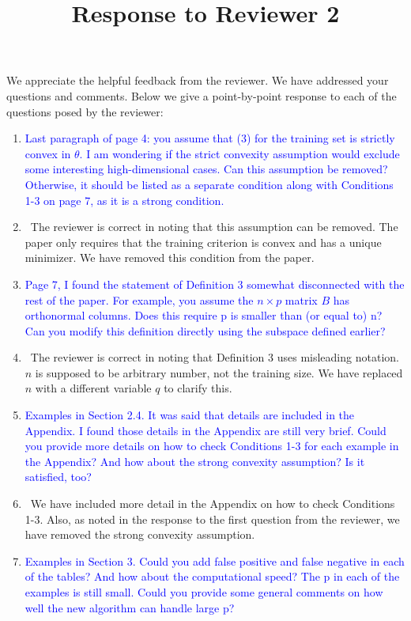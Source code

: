 \documentclass[]{article}
\title{Response to Reviewer 2}
\newcommand{\point}[1]{\item \textcolor{blue}{#1}}
\newcommand{\reply}{\item[]\ }
\begin{document}
	\maketitle
		
	We appreciate the helpful feedback from the reviewer. We have addressed your questions and comments. Below we give a point-by-point response to each of the questions posed by the reviewer:
		
	\begin{enumerate}
		\point{Last paragraph of page 4: you assume that (3) for the training set is strictly convex in $\theta$. I am wondering if the strict convexity assumption would exclude some interesting high-dimensional cases. Can this assumption be removed? Otherwise, it should be listed as a separate condition along with Conditions 1-3 on page 7, as it is a strong condition.}
		
		\reply The reviewer is correct in noting that this assumption can be removed. The paper only requires that the training criterion is convex and has a unique minimizer. We have removed this condition from the paper.
		
		\point{Page 7, I found the statement of Definition 3 somewhat disconnected with the rest of the paper. For example, you assume the $n\times p$ matrix $B$ has orthonormal columns. Does this require p is smaller than (or equal to) n? Can you modify this definition directly using the subspace defined earlier?}
		
		\reply The reviewer is correct in noting that Definition 3 uses misleading notation. $n$ is supposed to be arbitrary number, not the training size. We have replaced $n$ with a different variable $q$ to clarify this. 
		
		\point{Examples in Section 2.4. It was said that details are included in the Appendix. I found those details in the Appendix are still very brief. Could you provide more details on how to check Conditions 1-3 for each example in the Appendix? And how about the strong convexity assumption? Is it satisfied, too?}
		
		\reply We have included more detail in the Appendix on how to check Conditions 1-3. Also, as noted in the response to the first question from the reviewer, we have removed the strong convexity assumption.
		
		\point{Examples in Section 3. Could you add false positive and false negative in each of the tables? And how about the computational speed? The p in each of the examples is still small. Could you provide some general comments on how well the new algorithm can handle large p?}
		

\end{enumerate}
\end{document}
